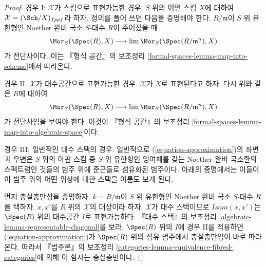 \begin{proof}
경우 I: $\mathcal{X}$가 스킴으로 표현가능한 경우. $S$ 위의 어떤 스킴
$X$에 대하여 $\mathcal{X} = (\Sch/X)_{fppf}$라 하자. 정의를 풀어 쓰면
다음을 증명해야 한다. $R/\mathfrak m$이 $S$ 위 유한형인 Noether 완비
국소 $S$-대수 $R$이 주어졌을 때
$$
\Mor_S(\Spec(R), X) \longrightarrow \lim \Mor_S(\Spec(R/\mathfrak m^n), X)
$$
가 전단사이다. 이는 『형식 공간』의 보조정리
\ref{formal-spaces-lemma-map-into-scheme}에서 따라온다.

\medskip\noindent
경우 II. $\mathcal{X}$가 대수공간으로 표현가능한 경우.
$\mathcal{X}$가 $X$로 표현된다고 하자. 다시 위와 같은 $R$에 대하여
$$
\Mor_S(\Spec(R), X) \longrightarrow \lim \Mor_S(\Spec(R/\mathfrak m^n), X)
$$
가 전단사임을 보여야 한다. 이것이 『형식 공간』의 보조정리
\ref{formal-spaces-lemma-map-into-algebraic-space}이다.

\medskip\noindent
경우 III: 일반적인 대수 스택의 경우. 일반적으로
(\ref{equation-approximation})의 좌변과 우변은 $S$ 위의 아핀 스킴 중
$S$ 위 유한형인 잉여체를 갖는 Noether 완비 국소환의 스펙트럼인 것들의
범주 위에 준군들로 섬유화된 범주이다. 아래의 증명에서는 이들이 이 범주
위의 어떤 위상에 대한 스택을 이룸도 보게 된다.

\medskip\noindent
먼저 충실충만성을 증명하자. $k = R/\mathfrak m$이 $S$ 위 유한형인
Noether 완비 국소 $S$-대수 $R$을 택하자. $x, x'$를 $R$ 위의
$\mathcal{X}$의 대상이라 하자. $\mathcal{X}$가 대수 스택이므로
$\mathit{Isom}(x, x')$는 $\Spec(R)$ 위의 대수공간 $I$로 표현가능하다.
『대수 스택』의 보조정리
\ref{algebraic-lemma-representable-diagonal}를 보라. $\Spec(R)$ 위의
$I$에 경우 II를 적용하면 (\ref{equation-approximation})가
$\Spec(R)$ 위의 섬유 범주에서 충실충만임이 바로 따라온다. 따라서
『범주론』의 보조정리
\ref{categories-lemma-equivalence-fibred-categories}에 의해 이 함자는
충실충만이다.


\end{proof}
